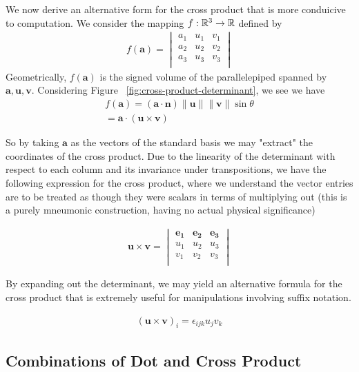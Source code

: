 \documentclass[]{article}
\begin{document}
We now derive an alternative form for the cross product that is more conduicive to computation. We consider the mapping $f: \mathbb{R}^3 \to \mathbb{R}$ defined by 
\begin{align*}
		f(\mathbf{a}) = \begin{vmatrix}
				a_1 & u_1 & v_1 \\
				a_2 & u_2 & v_2 \\
				a_3 & u_3 & v_3 \\
		\end{vmatrix}	
\end{align*}
Geometrically, $f(\mathbf{a})$ is the signed volume of the parallelepiped spanned by $\mathbf{a}, \mathbf{u}, \mathbf{v}$. Considering Figure ~\ref{fig:cross-product-determinant}, we see we have 
\begin{align*}
		f(\mathbf{a}) = (\mathbf{a} \cdot \mathbf{n}) \|\mathbf{u}\|\|\mathbf{v}\|\sin\theta  \\
		= \mathbf{a} \cdot (\mathbf{u} \times \mathbf{v})
\end{align*}

So by taking $\mathbf{a}$ as the vectors of the standard basis we may "extract" the coordinates of the cross product. Due to the linearity of the determinant with respect to each column and its invariance under transpositions, we have the following expression for the cross product, where we understand the vector entries are to be treated as though they were scalars in terms of multiplying out (this is a purely mneumonic construction, having no actual physical significance)

\begin{align*}
		\mathbf{u} \times \mathbf{v} = \begin{vmatrix}
				\mathbf{e_1} & \mathbf{e_2} & \mathbf{e_3} \\
				u_1 & u_2 & u_3 \\
				v_1 & v_2 & v_3 \\
		\end{vmatrix}	
\end{align*}

By expanding out the determinant, we may yield an alternative formula for the cross product that is extremely useful for manipulations involving suffix notation.

\begin{align*}
		(\mathbf{u} \times \mathbf{v})_i = \epsilon_{ijk} u_j v_k
\end{align*}

\subsection{Combinations of Dot and Cross Product}
\end{document}
